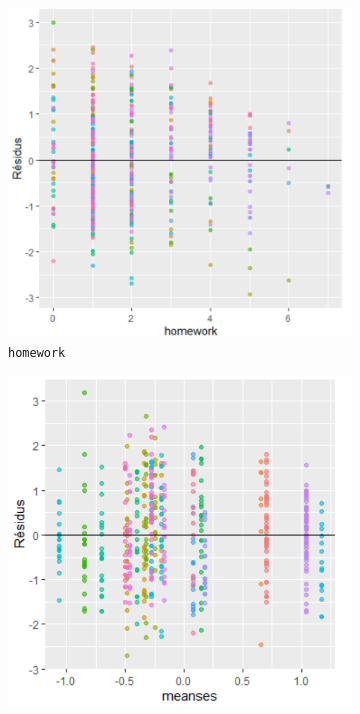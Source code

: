 \documentclass{article}
\begin{document}
\begin{figure}[H]  %
	\centering
	\begin{subfigure}{0.48\textwidth}
		\includegraphics[width=1\textwidth]{graphiques/Residus_VS_Homework}
		\caption{\texttt{homework}}
		\label{Residus_VS_Homework_qst1b}
	\end{subfigure}
	\begin{subfigure}{0.48\textwidth}
		\includegraphics[width=1\textwidth]{graphiques/Residus_VS_meanses}

\end{subfigure}
\end{figure}
\end{document}
